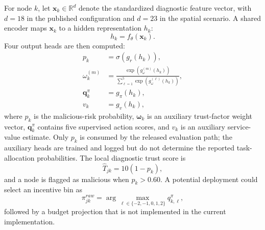 \documentclass[notspecified,article,submit,moreauthors]{Definitions/mdpi}
\begin{document}
For node $k$, let $\mathbf{x}_k \in \mathbb{R}^{d}$ denote the standardized diagnostic feature vector, with $d = 18$ in the published configuration and $d = 23$ in the spatial scenario. A shared encoder maps $\mathbf{x}_k$ to a hidden representation $h_k$:
\begin{equation}
h_k = f_{\theta}(\mathbf{x}_k).
\end{equation}
Four output heads are then computed:
\begin{equation}
\begin{aligned}
p_k &= \sigma(g_r(h_k)),\\
\omega_k^{(m)} &= \frac{\exp(g_{\omega}^{(m)}(h_k))}{\sum_{\ell=1}^{5}\exp(g_{\omega}^{(\ell)}(h_k))},\\
\mathbf{q}_k^{\pi} &= g_{\pi}(h_k),\\
v_k &= g_v(h_k),
\end{aligned}
\label{eq:policy_heads}
\end{equation}
where $p_k$ is the malicious-risk probability, $\boldsymbol{\omega}_k$ is an auxiliary trust-factor weight vector, $\mathbf{q}_k^{\pi}$ contains five supervised action scores, and $v_k$ is an auxiliary service-value estimate. Only $p_k$ is consumed by the released evaluation path; the auxiliary heads are trained and logged but do not determine the reported task-allocation probabilities. The local diagnostic trust score is
\begin{equation}
\hat{T}_{jk}=10(1-p_k),
\end{equation}
and a node is flagged as malicious when $p_k > 0.60$. A potential deployment could select an incentive bin as
\begin{equation}
\pi_{jk}^{raw} = \arg\max_{\ell \in \{-2,-1,0,1,2\}} q_{k,\ell}^{\pi},
\end{equation}
followed by a budget projection that is not implemented in the current implementation.
\end{document}
